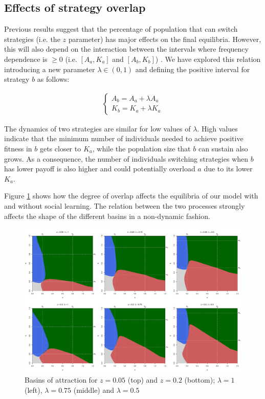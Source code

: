 \documentclass[preprint,authoryear]{elsarticle}
\begin{document}
\subsection{Effects of strategy overlap}

Previous results suggest that the percentage of population that can switch strategies (i.e. the $z$ parameter) has major effects on the final equilibria. However, this will also depend on the interaction between the intervals where frequency dependence is $\geq 0$ (i.e. $[A_a,K_a]$ and $[A_b,K_b]$) . We have explored this relation introducing a new parameter $\lambda \in (0,1)$ and defining the positive interval for strategy $b$ as follows:

\begin{align}
\label{eqOverlap}
\begin{cases}
A_b = A_a + \lambda A_a\\
K_b = K_a + \lambda K_a
\end{cases}
\end{align}

The dynamics of two strategies are similar for low values of $\lambda$. High values indicate that the minimum number of individuals needed to achieve positive fitness in $b$ gets closer to $K_a$, while the population size that $b$ can sustain also grows. As a consequence, the number of individuals switching strategies when $b$ has lower payoff is also higher and could potentially overload $a$ due to its lower $K_a$.

Figure \ref{fig:overlap} shows how the degree of overlap affects the equilibria of our model with and without social learning. The relation between the two processes strongly affects the shape of the different basins in a non-dynamic fashion.


\begin{figure}[h!]
  \centering
      \includegraphics[width=\textwidth]{./figures/figure5}
  \caption{Basins of attraction for $z=0.05$ (top) and $z=0.2$ (bottom); $\lambda=1$ (left), $\lambda=0.75$ (middle) and $\lambda=0.5$}
    \label{fig:overlap}
\end{figure}
\end{document}
